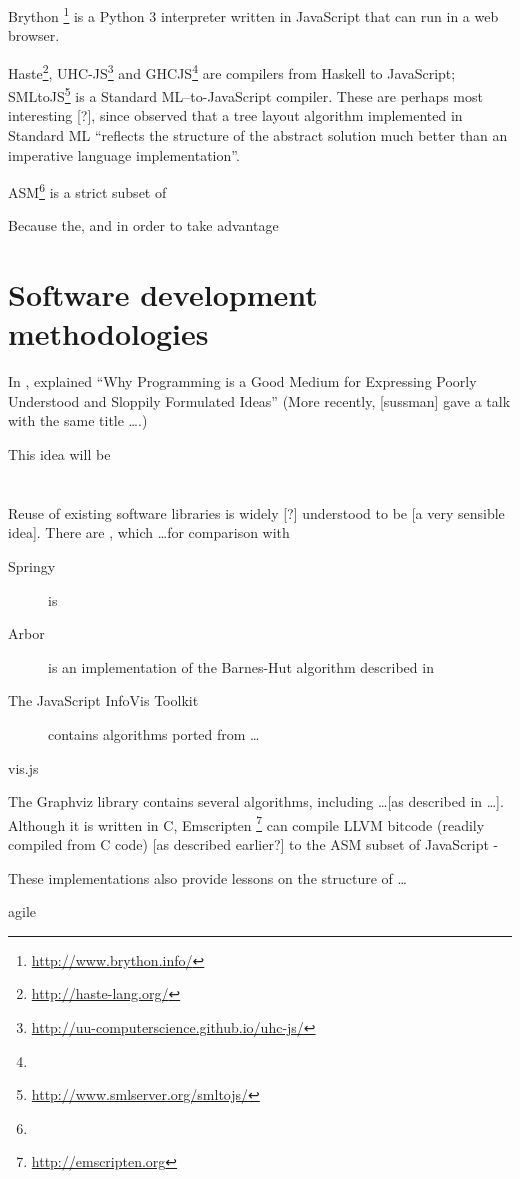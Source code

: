 Brython \footnote{\url{http://www.brython.info/}} is a Python 3 interpreter written in JavaScript that can run in a web browser. 

Haste\footnote{\url{http://haste-lang.org/}}, UHC-JS\footnote{\url{http://uu-computerscience.github.io/uhc-js/}}
and GHCJS\footnote{} are compilers from Haskell to JavaScript;
SMLtoJS\footnote{\url{http://www.smlserver.org/smltojs/}} is a Standard ML--to-JavaScript compiler.
These are perhaps most interesting [?], since \citet{kennedyfuntrees} observed that a tree layout algorithm implemented in Standard ML ``reflects the structure of the abstract solution much better than an imperative language implementation''.

ASM\footnote{} is a strict subset of 

Because the, and in order to take advantage


\section{Software development methodologies}

In \citeyear{67poorslop}, \citet*{67poorslop} explained ``Why Programming is a Good Medium for Expressing Poorly Understood and Sloppily Formulated Ideas''
(More recently, [sussman] gave a talk with the same title \ldots {}.)

This idea will be 


\section{}

Reuse of existing software libraries is widely [?] understood to be [a very sensible idea]. There are , which \ldots for comparison with 

\begin{description}
  \item[Springy] is 
  \item[Arbor] is an implementation of the Barnes-Hut algorithm described in  
  \item[The JavaScript InfoVis Toolkit] contains algorithms ported from \ldots
  \item[vis.js]
\end{description}

The Graphviz library contains several algorithms, including \ldots [as described in \ldots]. Although it is written in C, Emscripten \footnote{\url{http://emscripten.org}} can compile LLVM bitcode (readily compiled from C code) [as described earlier?] to the ASM subset of JavaScript -

These implementations also provide lessons on the structure of \ldots



agile





